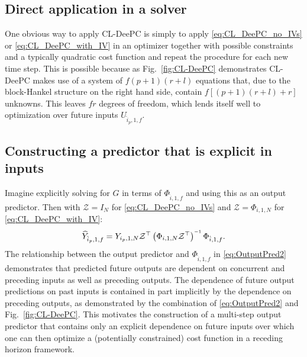 %
\subsection{Direct application in a solver}
One obvious way to apply \ac{CL-DeePC} is simply to apply \eqref{eq:CL_DeePC_no_IVs} or \eqref{eq:CL_DeePC_with_IV} in an optimizer together with possible constraints and a typically quadratic cost function and repeat the procedure for each new time step. This is possible because as Fig.~\ref{fig:CL-DeePC} demonstrates \ac{CL-DeePC} makes use of a system of $f(p+1)(r+l)$ equations that, due to the block-Hankel structure on the right hand side, contain $f[(p+1)(r+l)+r]$ unknowns. %
This leaves $fr$ degrees of freedom, which lends itself well to optimization over future inputs $U_{\hat{i}_p,1,f}$.
%
\subsection{Constructing a predictor that is explicit in inputs}
Imagine explicitly solving for $G$ in terms of $\Phi_{\hat{i},1,f}$ and using this as an output predictor. Then with $\mathcal{Z}=I_N$ for \eqref{eq:CL_DeePC_no_IVs} and $\mathcal{Z}=\Phi_{i,1,N}$ for \eqref{eq:CL_DeePC_with_IV}:
\begin{align}\label{eq:OutputPred2}
     \widehat{Y}_{\hat{i}_p,1,f} = Y_{i_p,1,N}{\mathcal{Z}}^\top \left(\Phi_{i,1,N}{\mathcal{Z}}^\top\right)\inv\Phi_{\hat{i},1,f}.
\end{align}
The relationship between the output predictor and $\Phi_{\hat{i},1,f}$ in \eqref{eq:OutputPred2} demonstrates that predicted future outputs are dependent on concurrent and preceding inputs as well as preceding outputs. The dependence of future output predictions on past inputs is contained in part implicitly by the dependence on preceding outputs, as demonstrated by the combination of \eqref{eq:OutputPred2} and Fig.~\ref{fig:CL-DeePC}. This motivates the construction of a multi-step output predictor that contains only an explicit dependence on future inputs over which one can then optimize a (potentially constrained) cost function in a receding horizon framework.
